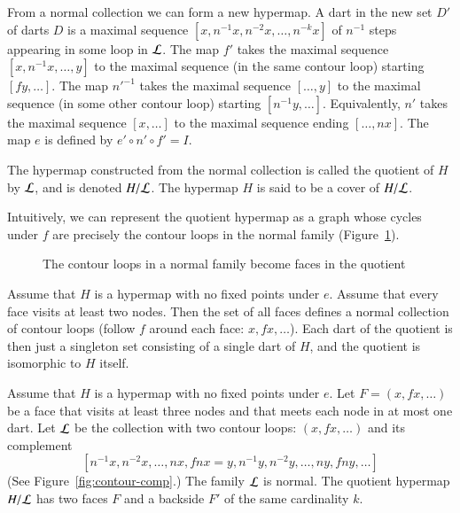 From a normal collection we can form a new hypermap.   A dart in the
new set $D'$ of darts
$D$ is a maximal sequence $[x,n^{-1} x, n^{-2} x,\ldots,n^{-k} x]$
    of $n^{-1}$ steps appearing in some loop in $\cal L$.
The map $f'$ takes the maximal sequence
    $[x,n^{-1}x,\ldots,y]$ to the maximal
   sequence (in the same contour loop) starting 
    $[f y,\ldots]$.
The map ${n'}^{-1}$ takes the maximal sequence
    $[\ldots,y]$ to the maximal sequence (in some other contour loop)
starting $[n^{-1}y,\ldots]$. Equivalently, 
$n'$ takes the maximal sequence
$[x,\ldots]$ to the maximal sequence ending $[\ldots,n x]$. The map $e$ is
defined by $e'\circ n'\circ f' = I$.  

\begin{definition}  The hypermap constructed from the normal collection
is called the quotient of $H$ by $\cal L$, and is denoted $H/{\cal
L}$.  The hypermap $H$ is said to be a cover of $H/{\cal L}$.
\end{definition}

Intuitively, we can represent the quotient hypermap as a graph whose
cycles under $f$ 
are precisely the contour loops in the normal family (Figure~\ref{fig:quot}).

\begin{figure}[htb]
  \centering
  \caption{The contour loops in a normal 
   family become faces in the
   quotient}
  \label{fig:quot}
\end{figure}


\begin{example}\label{ex:Hall} 
Assume that $H$ is a hypermap with no fixed points under $e$.
Assume that every face visits at least two nodes.
Then the set of all faces
defines a normal collection of contour loops (follow $f$ around each face:
$x,f x,\ldots$).  Each dart of the quotient is then just a singleton
set consisting of a single dart of $H$, and the quotient is
isomorphic to $H$ itself.
\end{example}

\begin{example}\label{ex:H2} 
Assume that $H$ is a hypermap with no fixed points
under $e$.  Let $F = (x,f x,\ldots)$ be a face 
that visits at least
three nodes and that meets each node in at most one dart.
Let $\cal L$ be the
collection with two contour loops:  $(x,f x,\ldots)$ and its
complement
$$[n^{-1} x,
n^{-2} x,\ldots,n x,f n x = y,n^{-1} y, n^{-2} y,\ldots, n y, f n
y,\ldots]
$$
(See Figure~\ref{fig:contour-comp}.) 
The family $\cal L$ is normal.
The quotient hypermap $H/{\cal L}$ has two faces $F$ and a
backside $F'$ of the same cardinality $k$.
\end{example}


